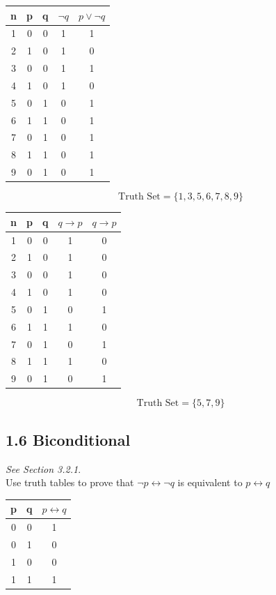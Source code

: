 \documentclass[]{report}
\begin{document}
\begin{tabular}{|c|c|c|c|c|}
\hline n & p & q & $\neg q$ & $p \vee \neg q$ \\ 
\hline 1 & 0 & 0 & 1 & 1\\ 
\hline 2 & 1 & 0 & 1 & 0\\ 
\hline 3 & 0 & 0 & 1 & 1\\ 
\hline 4 & 1 & 0 & 1 & 0\\ 
\hline 5 & 0 & 1 & 0 & 1\\ 
\hline 6 & 1 & 1 & 0 & 1\\ 
\hline 7 & 0 & 1 & 0 & 1\\ 
\hline 8 & 1 & 1 & 0 & 1\\ 
\hline 9 & 0 & 1 & 0 & 1\\ 
\hline 
\end{tabular} 
\[\mbox{Truth Set} = \{1,3,5,6,7,8,9\}\]

\begin{tabular}{|c|c|c|c|c|}
\hline n & p & q & $  q \rightarrow p$ & $  q \rightarrow p$ \\ 
\hline 1 & 0 & 0 & 1 & 0\\ 
\hline 2 & 1 & 0 & 1 & 0\\ 
\hline 3 & 0 & 0 & 1 & 0\\ 
\hline 4 & 1 & 0 & 1 & 0\\ 
\hline 5 & 0 & 1 & 0 & 1\\ 
\hline 6 & 1 & 1 & 1 & 0\\ 
\hline 7 & 0 & 1 & 0 & 1\\ 
\hline 8 & 1 & 1 & 1 & 0\\ 
\hline 9 & 0 & 1 & 0 & 1\\ 
\hline 
\end{tabular} 
\[\mbox{Truth Set} = \{5,7,9\}\]
\newpage
\subsection*{1.6 Biconditional}
\emph{See Section 3.2.1}.\\
Use truth tables to prove that $ \neg p \leftrightarrow \neg q $ is equivalent to  $ p \leftrightarrow q $

\begin{tabular}{|c|c|c|}
\hline  p& q & $p \leftrightarrow q$ \\ 
\hline  0& 0 &  1\\ 
\hline  0& 1 &  0\\ 
\hline  1& 0 &  0\\ 
\hline  1& 1 &  1\\ 
\hline 
\end{tabular} 
\end{document}
